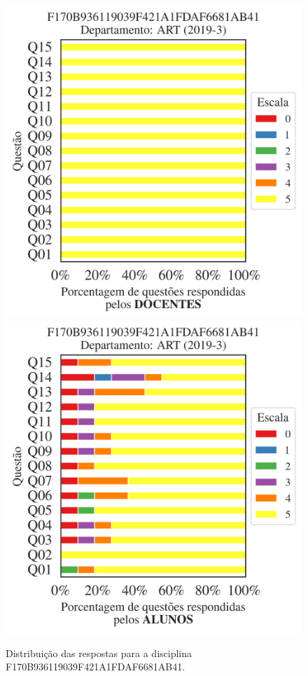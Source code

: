 \documentclass[a4paper,10pt]{article}
\begin{document}
\begin{figure}[h]
\centering
\includegraphics[width=0.485\linewidth]{analise_disciplina_departamento_ART_F170B936119039F421A1FDAF6681AB41_docentes.png}
\includegraphics[width=0.485\linewidth]{analise_disciplina_departamento_ART_F170B936119039F421A1FDAF6681AB41_alunos.png}
\caption{\label{fig:analise_geral_departamento}                Distribuição das respostas para a disciplina F170B936119039F421A1FDAF6681AB41. }
\end{figure}
\end{document}
